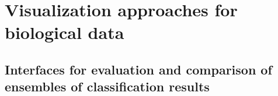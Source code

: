 \documentclass[12pt]{cmuthesis}
\begin{document}
\tableofcontents
\listoffigures
\listoftables

\mainmatter


%
%
%
%
%







\part{Visualization approaches for biological data}
\label{part:vis}



\chapter{Interfaces for evaluation and comparison of ensembles of classification results}
\label{chapter:coral}
\end{document}
